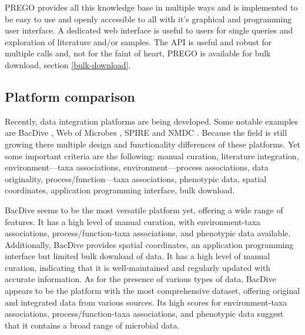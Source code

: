 PREGO provides all this knowledge base in multiple 
ways and is implemented to be easy to use and openly accessible to all with it’s graphical and programming user interface.
A dedicated web interface is useful to users for single queries
and exploration of literature and/or samples. The API is useful and 
robust for multiple calls and, not for the faint of heart, PREGO is 
available for bulk download, section \ref{bulk-download}. 


   \subsection{Platform comparison}
   \label{subsec:prego-similar-platforms}


Recently, data integration platforms are being developed.
Some notable examples are BacDive \parencite{reimer2021bacdive},
Web of Microbes \parencite{kosina2018web}, SPIRE \parencite{schmidt2023spire} and NMDC \parencite{eloe-fadrosh2022the-national}.
Because the field is still growing there multiple design and functionality 
differences of these platforms. Yet some important criteria are the following:
manual curation, literature integration, environment—taxa associations, environment—process associations,
data originality, process/function—taxa associations,
phenotypic data, spatial coordinates, application programming interface, bulk download.

BacDive seems to be the most versatile
platform yet, offering a wide range of features. It has a high level
of manual curation, with environment-taxa associations, process/function-taxa
associations, and phenotypic data available. Additionally, BacDive provides
spatial coordinates, an application programming interface but limited bulk download of data.
It has a high level of manual curation, indicating that it is well-maintained and regularly updated with accurate information.
As for the presence of various types of data, BacDive appears to be the platform
with the most comprehensive dataset, offering original and integrated data from
various sources. Its high scores for environment-taxa associations,
process/function-taxa associations, and phenotypic data suggest that it contains a broad range of microbial data.

